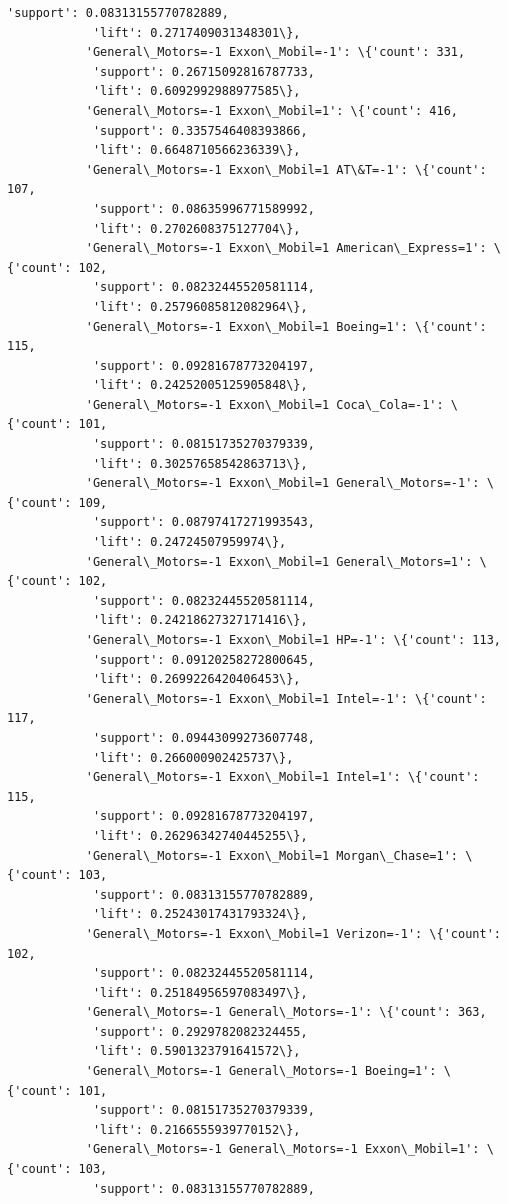 \documentclass[11pt]{article}
\begin{document}
\begin{Verbatim}[commandchars=\\\{\}]
            'support': 0.08313155770782889,
            'lift': 0.2717409031348301\},
           'General\_Motors=-1 Exxon\_Mobil=-1': \{'count': 331,
            'support': 0.26715092816787733,
            'lift': 0.6092992988977585\},
           'General\_Motors=-1 Exxon\_Mobil=1': \{'count': 416,
            'support': 0.3357546408393866,
            'lift': 0.6648710566236339\},
           'General\_Motors=-1 Exxon\_Mobil=1 AT\&T=-1': \{'count': 107,
            'support': 0.08635996771589992,
            'lift': 0.2702608375127704\},
           'General\_Motors=-1 Exxon\_Mobil=1 American\_Express=1': \{'count': 102,
            'support': 0.08232445520581114,
            'lift': 0.25796085812082964\},
           'General\_Motors=-1 Exxon\_Mobil=1 Boeing=1': \{'count': 115,
            'support': 0.09281678773204197,
            'lift': 0.24252005125905848\},
           'General\_Motors=-1 Exxon\_Mobil=1 Coca\_Cola=-1': \{'count': 101,
            'support': 0.08151735270379339,
            'lift': 0.30257658542863713\},
           'General\_Motors=-1 Exxon\_Mobil=1 General\_Motors=-1': \{'count': 109,
            'support': 0.08797417271993543,
            'lift': 0.24724507959974\},
           'General\_Motors=-1 Exxon\_Mobil=1 General\_Motors=1': \{'count': 102,
            'support': 0.08232445520581114,
            'lift': 0.24218627327171416\},
           'General\_Motors=-1 Exxon\_Mobil=1 HP=-1': \{'count': 113,
            'support': 0.09120258272800645,
            'lift': 0.2699226420406453\},
           'General\_Motors=-1 Exxon\_Mobil=1 Intel=-1': \{'count': 117,
            'support': 0.09443099273607748,
            'lift': 0.266000902425737\},
           'General\_Motors=-1 Exxon\_Mobil=1 Intel=1': \{'count': 115,
            'support': 0.09281678773204197,
            'lift': 0.26296342740445255\},
           'General\_Motors=-1 Exxon\_Mobil=1 Morgan\_Chase=1': \{'count': 103,
            'support': 0.08313155770782889,
            'lift': 0.25243017431793324\},
           'General\_Motors=-1 Exxon\_Mobil=1 Verizon=-1': \{'count': 102,
            'support': 0.08232445520581114,
            'lift': 0.25184956597083497\},
           'General\_Motors=-1 General\_Motors=-1': \{'count': 363,
            'support': 0.2929782082324455,
            'lift': 0.5901323791641572\},
           'General\_Motors=-1 General\_Motors=-1 Boeing=1': \{'count': 101,
            'support': 0.08151735270379339,
            'lift': 0.2166555939770152\},
           'General\_Motors=-1 General\_Motors=-1 Exxon\_Mobil=1': \{'count': 103,
            'support': 0.08313155770782889,

\end{Verbatim}
\end{document}
